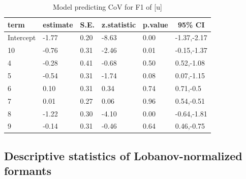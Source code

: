 \documentclass[
]{article}
\begin{document}
\begin{table}[tbp]

\begin{center}
\begin{threeparttable}

\caption{\label{tab:f1-u-model}Model predicting CoV for F1 of [u]}

\begin{tabular}{llllll}
\toprule
term & \multicolumn{1}{c}{estimate} & \multicolumn{1}{c}{S.E.} & \multicolumn{1}{c}{z.statistic} & \multicolumn{1}{c}{p.value} & \multicolumn{1}{c}{95\% CI}\\
\midrule
Intercept & -1.77 & 0.20 & -8.63 & 0.00 & -1.37,-2.17\\
10 & -0.76 & 0.31 & -2.46 & 0.01 & -0.15,-1.37\\
4 & -0.28 & 0.41 & -0.68 & 0.50 & 0.52,-1.08\\
5 & -0.54 & 0.31 & -1.74 & 0.08 & 0.07,-1.15\\
6 & 0.10 & 0.31 & 0.34 & 0.74 & 0.71,-0.5\\
7 & 0.01 & 0.27 & 0.06 & 0.96 & 0.54,-0.51\\
8 & -1.22 & 0.30 & -4.10 & 0.00 & -0.64,-1.81\\
9 & -0.14 & 0.31 & -0.46 & 0.64 & 0.46,-0.75\\
\bottomrule
\end{tabular}

\end{threeparttable}
\end{center}

\end{table}

\hypertarget{descriptive-statistics-of-lobanov-normalized-formants}{%
\subsection{Descriptive statistics of Lobanov-normalized formants}\label{descriptive-statistics-of-lobanov-normalized-formants}}
\end{document}
